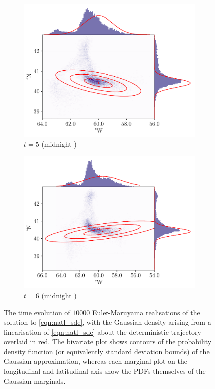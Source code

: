 \begin{figure}
\begin{center}
\begin{subfigure}{0.49\textwidth}
			\includegraphics[width=\textwidth]{chp06_applications/figures/gulf_stream/traj_stoch_em_5.0}
			\caption{\(t = 5\) (midnight )}
		\end{subfigure}
		\begin{subfigure}{0.49\textwidth}
			\includegraphics[width=\textwidth]{chp06_applications/figures/gulf_stream/traj_stoch_em_6.0}
			\caption{\(t = 6\) (midnight )}
		\end{subfigure}
		\caption{The time evolution of \(10000\) Euler-Maruyama realisations of the solution to \cref{eqn:natl_sde}, with the Gaussian density arising from a linearisation of \cref{eqn:natl_sde} about the deterministic trajectory overlaid in red.
			The bivariate plot shows contours of the probability density function (or equivalently standard deviation bounds) of the Gaussian approximation, whereas each marginal plot on the longitudinal and latitudinal axis show the PDFs themselves of the Gaussian marginals.}
		\label{fig:natl_em}
	\end{center}
\end{figure}


